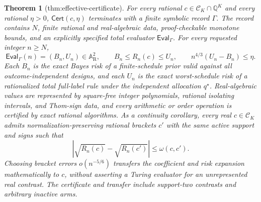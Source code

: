 \documentclass{article}
\newtheorem{theorem}{Theorem}
\begin{document}
\begin{theorem}[thm:effective-certificate]\label{thm:effective-certificate}
For every rational \(c\in\mathcal C_K\cap\mathbb Q^K\) and every rational \(\eta>0\), \(\mathsf{Cert}(c,\eta)\) terminates with a finite symbolic record \(\Gamma\). The record contains \(N\), finite rational and real-algebraic data, proof-checkable monotone bounds, and an explicitly specified total evaluator \(\mathsf{Eval}_{\Gamma}\). For every requested integer \(n\ge N\),
\[
\mathsf{Eval}_{\Gamma}(n)=(B_n,U_n)\in\mathbb A_{\mathrm R}^2,
\qquad B_n\le R_n(c)\le U_n,
\qquad n^{4/3}(U_n-B_n)\le\eta.
\]
Each \(B_n\) is the exact Bayes risk of a finite-schedule prior valid against all outcome-independent designs, and each \(U_n\) is the exact worst-schedule risk of a rationalized total full-label rule under the independent allocation \(q^\star\). Real-algebraic values are represented by square-free integer polynomials, rational isolating intervals, and Thom-sign data, and every arithmetic or order operation is certified by exact rational algorithms. As a continuity corollary, every real \(c\in\mathcal C_K\) admits normalization-preserving rational brackets \(c'\) with the same active support and signs such that
\[
|\sqrt{R_n(c)}-\sqrt{R_n(c')}|\le\omega(c,c').
\]
Choosing bracket errors \(o(n^{-5/6})\) transfers the coefficient and risk expansion mathematically to \(c\), without asserting a Turing evaluator for an unrepresented real contrast.  The certificate and transfer include support-two contrasts and arbitrary inactive arms.
\end{theorem}
\end{document}
